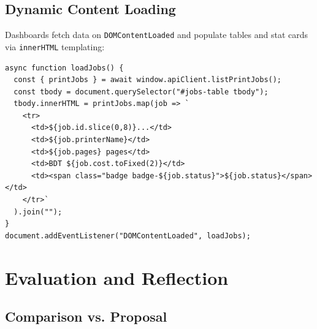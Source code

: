 \documentclass[12pt,a4paper]{report}
\begin{document}
\section{Dynamic Content Loading}

Dashboards fetch data on \texttt{DOMContentLoaded} and populate tables and stat cards via
\texttt{innerHTML} templating:

\begin{lstlisting}[style=jsStyle, caption={Dynamic job table population on dashboard}]
async function loadJobs() {
  const { printJobs } = await window.apiClient.listPrintJobs();
  const tbody = document.querySelector("#jobs-table tbody");
  tbody.innerHTML = printJobs.map(job => `
    <tr>
      <td>${job.id.slice(0,8)}...</td>
      <td>${job.printerName}</td>
      <td>${job.pages} pages</td>
      <td>BDT ${job.cost.toFixed(2)}</td>
      <td><span class="badge badge-${job.status}">${job.status}</span></td>
    </tr>`
  ).join("");
}
document.addEventListener("DOMContentLoaded", loadJobs);
\end{lstlisting}

\clearpage

\chapter{Evaluation and Reflection}

\section{Comparison vs. Proposal}
\end{document}
